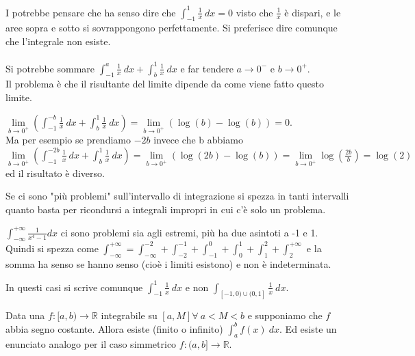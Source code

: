 \begin{observation}
I potrebbe pensare che ha senso dire che $\int_{-1}^1 \frac{1}{x}\:dx = 0$ visto che $\frac{1}{x}$ è dispari, e le aree sopra e sotto si sovrappongono perfettamente. Si preferisce dire comunque che l'integrale non esiste.\\\\
Si potrebbe sommare $\int_{-1}^a\frac{1}{x}\:dx + \int_b^1\frac{1}{x}\:dx$ e far tendere $a\to 0^-$ e $b\to 0^+$.\\
Il problema è che il risultante del limite dipende da come viene fatto questo limite.
\begin{example}
$\lim\limits_{b\to 0^+}(\int_{-1}^{-b}\frac{1}{x}\:dx + \int_b^1\frac{1}{x}\:dx) = \lim\limits_{b\to 0^+}(\log(b)-\log(b))=0$. \\
Ma per esempio se prendiamo $-2b$ invece che b abbiamo $\lim\limits_{b\to 0^+}(\int_{-1}^{-2b}\frac{1}{x}\:dx + \int_b^1\frac{1}{x}\:dx) = \lim\limits_{b\to 0^+}(\log(2b)-\log(b)) = \lim\limits_{b\to 0^+} \log(\frac{2b}{b}) = \log(2)$ ed il risultato è diverso.
\end{example}
\end{observation}

\hspace{-15pt} Se ci sono "più problemi" sull'intervallo di integrazione si spezza in tanti intervalli quanto basta per ricondursi a integrali impropri in cui c'è solo un problema.
\begin{example}
$\int_{-\infty}^{+\infty}\frac{1}{x^4-1}dx$ ci sono problemi sia agli estremi, più ha due asintoti a -1 e 1.\\
Quindi si spezza come $\int_{-\infty}^{+\infty} = \int_{-\infty}^{-2} + \int_{-2}^{-1} + \int_{-1}^{0} + \int_{0}^{1} + \int_{1}^{2} + \int_{2}^{+\infty}$ e la somma ha senso se hanno senso (cioè i limiti esistono) e non è indeterminata.
\end{example}

\begin{observation}
In questi casi si scrive comunque $\int_{-1}^1 \frac{1}{x}\:dx$ e non $\int_{[-1,0)\cup(0,1]}\frac{1}{x}\:dx$.
\end{observation}

\begin{proposition}
Data una $f:[a,b)\to \mathbb{R}$ integrabile su $[a,M] \forall \: a<M<b$ e supponiamo che $f$ abbia segno costante. Allora esiste (finito o infinito) $\int_a^b f(x)\:dx$. Ed esiste un enunciato analogo per il caso simmetrico $f:(a,b]\to \mathbb{R}$.
\end{proposition}

